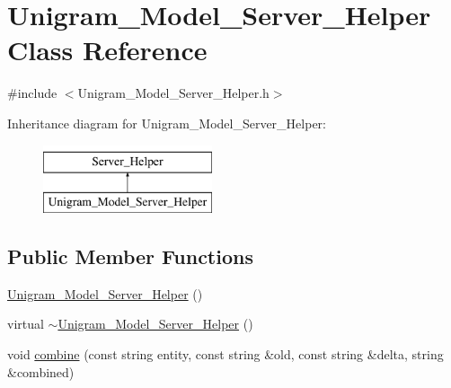 \hypertarget{class_unigram___model___server___helper}{
\section{Unigram\_\-Model\_\-Server\_\-Helper Class Reference}
\label{class_unigram___model___server___helper}
}


{\ttfamily \#include $<$Unigram\_\-Model\_\-Server\_\-Helper.h$>$}

Inheritance diagram for Unigram\_\-Model\_\-Server\_\-Helper:\begin{figure}[H]
\begin{center}
\leavevmode
\includegraphics[height=2cm]{class_unigram___model___server___helper}
\end{center}
\end{figure}
\subsection*{Public Member Functions}
\begin{DoxyCompactItemize}
\item 
\hyperlink{class_unigram___model___server___helper_a9058237cc4b9b1cdda07b8c0aff5cb4d}{Unigram\_\-Model\_\-Server\_\-Helper} ()
\item 
virtual \hyperlink{class_unigram___model___server___helper_ac8061cb3d7f6e4965c8d718e25356a63}{$\sim$Unigram\_\-Model\_\-Server\_\-Helper} ()
\item 
void \hyperlink{class_unigram___model___server___helper_a44b942cb380cbb1207bc994ac14a368c}{combine} (const string entity, const string \&old, const string \&delta, string \&combined)
\end{DoxyCompactItemize}



